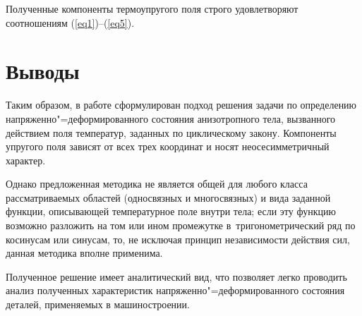 \documentclass[press]{vestnik}
\begin{document}
Полученные компоненты термоупругого поля строго удовлетворяют соотношениям 
(\ref{eq1})--(\ref{eq5}).

\section*{Выводы}

Таким образом, в работе сформулирован подход решения задачи по определению 
напряженно"=деформированного состояния анизотропного тела, вызванного 
действием поля температур, заданных по циклическому закону. Компоненты 
упругого поля зависят от всех трех координат и носят неосесимметричный 
характер.

Однако предложенная методика не является общей для любого класса 
рассматриваемых областей (односвязных и многосвязных) и вида заданной 
функции, описывающей температурное поле внутри тела; если эту 
функцию возможно разложить на том или ином промежутке в~тригонометрический 
ряд по косинусам или синусам, то, не исключая принцип независимости действия 
сил, данная методика вполне применима.

Полученное решение имеет аналитический вид, что позволяет легко проводить 
анализ полученных характеристик напряженно"=деформированного состояния 
деталей, применяемых в машиностроении.
\end{document}
